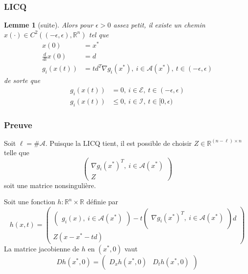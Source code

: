 \documentclass[usepdftitle=false]{beamer}
\newtheorem{lem}{Lemme}
\def\cA{\mathcal{A}}
\def\cE{\mathcal{E}}
\def\cI{\mathcal{I}}
\def\RR{\mathbb{R}}
\begin{document}
\begin{frame}
\frametitle{LICQ}

\begin{lem}[suite]
Alors pour $\epsilon > 0$ assez petit, il existe un chemin $x(\cdot) \in C^2 \left((-\epsilon, \epsilon), \RR^n \right)$ tel que
\begin{align*}
x(0) &= x^* \\
\frac{d}{dt} x(0) &= d \\
g_i(x(t)) &= td^T\nabla g_i(x^*),\ i \in \cA(x^*),\ t \in (-\epsilon, \epsilon)
\end{align*}
de sorte que
\begin{align*}
g_i(x(t)) &= 0,\ i \in \cE,\ t \in (-\epsilon, \epsilon) \\
g_i(x(t)) &\leq 0,\ i \in \cI,\ t \in [0, \epsilon)
\end{align*}
\end{lem}

\end{frame}

\begin{frame}
\frametitle{Preuve}

Soit $\ell = \#\cA$.
Puisque la LICQ tient, il est possible de choisir $Z \in \RR^{(n-\ell) \times n}$ telle que
$$
\begin{pmatrix}
\nabla g_i(x^*)^T, \ i \in \cA(x^*) \\
Z
\end{pmatrix}
$$
soit une matrice nonsingulière.

\mbox{}

Soit une fonction $h: \RR^n \times \RR$ définie par
$$
h(x,t) =
\begin{pmatrix}

\begin{pmatrix}
g_i(x), \ i \in \cA(x^*)
\end{pmatrix}
-t
\begin{pmatrix}
\nabla g_i(x^*)^T, \ i \in \cA(x^*) \\
\end{pmatrix}
d
\\

Z(x-x^*-td)

\end{pmatrix}
$$
La matrice jacobienne de $h$ en $(x^*, 0)$ vaut
$$
D h(x^*, 0) =
\begin{pmatrix}
D_x h(x^*, 0) & D_t h(x^*, 0)
\end{pmatrix}
$$

\end{frame}
\end{document}
